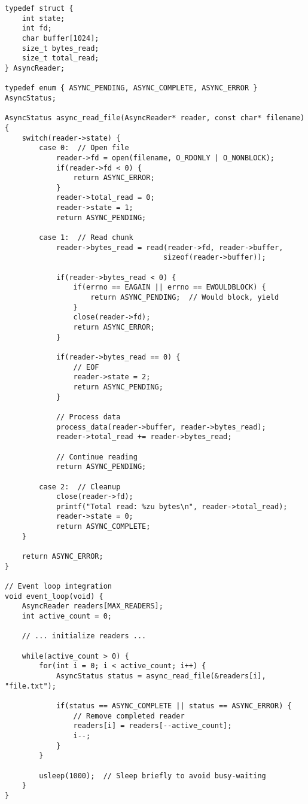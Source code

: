 \begin{lstlisting}
typedef struct {
    int state;
    int fd;
    char buffer[1024];
    size_t bytes_read;
    size_t total_read;
} AsyncReader;

typedef enum { ASYNC_PENDING, ASYNC_COMPLETE, ASYNC_ERROR } AsyncStatus;

AsyncStatus async_read_file(AsyncReader* reader, const char* filename) {
    switch(reader->state) {
        case 0:  // Open file
            reader->fd = open(filename, O_RDONLY | O_NONBLOCK);
            if(reader->fd < 0) {
                return ASYNC_ERROR;
            }
            reader->total_read = 0;
            reader->state = 1;
            return ASYNC_PENDING;

        case 1:  // Read chunk
            reader->bytes_read = read(reader->fd, reader->buffer,
                                     sizeof(reader->buffer));

            if(reader->bytes_read < 0) {
                if(errno == EAGAIN || errno == EWOULDBLOCK) {
                    return ASYNC_PENDING;  // Would block, yield
                }
                close(reader->fd);
                return ASYNC_ERROR;
            }

            if(reader->bytes_read == 0) {
                // EOF
                reader->state = 2;
                return ASYNC_PENDING;
            }

            // Process data
            process_data(reader->buffer, reader->bytes_read);
            reader->total_read += reader->bytes_read;

            // Continue reading
            return ASYNC_PENDING;

        case 2:  // Cleanup
            close(reader->fd);
            printf("Total read: %zu bytes\n", reader->total_read);
            reader->state = 0;
            return ASYNC_COMPLETE;
    }

    return ASYNC_ERROR;
}

// Event loop integration
void event_loop(void) {
    AsyncReader readers[MAX_READERS];
    int active_count = 0;

    // ... initialize readers ...

    while(active_count > 0) {
        for(int i = 0; i < active_count; i++) {
            AsyncStatus status = async_read_file(&readers[i], "file.txt");

            if(status == ASYNC_COMPLETE || status == ASYNC_ERROR) {
                // Remove completed reader
                readers[i] = readers[--active_count];
                i--;
            }
        }

        usleep(1000);  // Sleep briefly to avoid busy-waiting
    }
}
\end{lstlisting}

